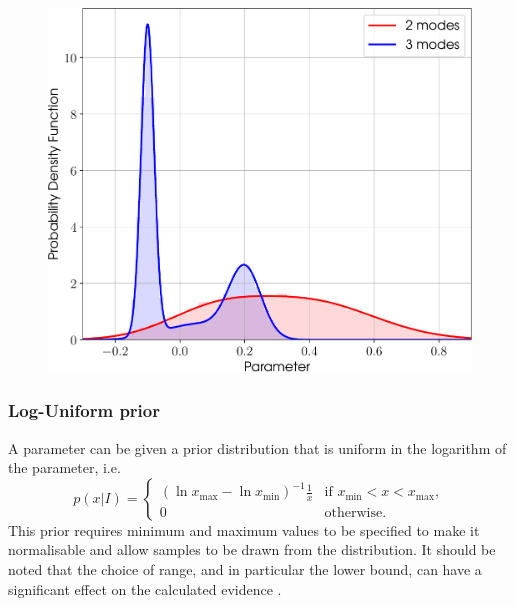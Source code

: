 \begin{figure}[!phtb]
\begin{center}
\includegraphics[width=1\columnwidth]{./figures/priors/gmm/gmm}
\caption{ \protect}
\end{center}
\end{figure}

\subsubsection{Log-Uniform prior}\label{sec:loguniform}

A parameter can be given a prior distribution that is uniform in the logarithm of the parameter, i.e.
\begin{equation}
 p(x|I) = \begin{cases}
             \left(\ln{x_{\text{max}}}-\ln{x_{\text{min}}}\right)^{-1}\frac{1}{x} & \text{if } x_{\text{min}} < x < x_{\text{max}}, \\
             0 & \text{otherwise}.
            \end{cases}
\end{equation}
This prior requires minimum and maximum values to be specified to make it normalisable and allow samples to be drawn from the
distribution. It should be noted that the choice of range, and in particular the lower bound, can have a significant effect on
the calculated evidence \citep[see, e.g., Appendix~B of][]{MaxCWpolariations}.

